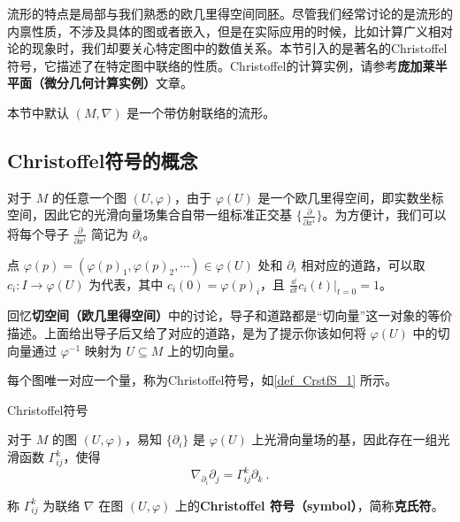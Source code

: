 


流形的特点是局部与我们熟悉的欧几里得空间同胚。尽管我们经常讨论的是流形的内禀性质，不涉及具体的图或者嵌入，但是在实际应用的时候，比如计算广义相对论的现象时，我们却要关心特定图中的数值关系。本节引入的是著名的Christoffel符号，它描述了在特定图中联络的性质。Christoffel的计算实例，请参考\textbf{庞加莱半平面（微分几何计算实例）}文章。

本节中默认 $(M, \nabla)$ 是一个带仿射联络的流形。


\subsection{Christoffel符号的概念}\label{sub_CrstfS_1}

对于 $M$ 的任意一个图 $(U, \varphi)$，由于 $\varphi(U)$ 是一个欧几里得空间，即实数坐标空间，因此它的光滑向量场集合自带一组标准正交基 $\{\frac{\partial}{\partial x^i}\}$。为方便计，我们可以将每个导子 $\frac{\partial}{\partial x^i}$ 简记为 $\partial_i$。

点 $\varphi(p)=(\varphi(p)_1, \varphi(p)_2, \cdots)\in\varphi(U)$ 处和 $\partial_i$ 相对应的道路，可以取 $c_i:I\to \varphi(U)$ 为代表，其中 $c_i(0)=\varphi(p)_i$，且 $\frac{\dd}{\dd t}c_i(t)|_{t=0}=1$。

回忆\textbf{切空间（欧几里得空间）}中的讨论，导子和道路都是“切向量”这一对象的等价描述。上面给出导子后又给了对应的道路，是为了提示你该如何将 $\varphi(U)$ 中的切向量通过 $\varphi^{-1}$ 映射为 $U\subseteq M$ 上的切向量。

每个图唯一对应一个量，称为Christoffel符号，如\autoref{def_CrstfS_1} 所示。

\begin{definition}{Christoffel符号}\label{def_CrstfS_1}

对于 $M$ 的图 $(U, \varphi)$，易知 $\{\partial_i\}$ 是 $\varphi(U)$ 上光滑向量场的基，因此存在一组光滑函数 $\Gamma^k_{ij}$，使得
\begin{equation}
\nabla_{\partial_i}\partial_j=\Gamma^k_{ij}\partial_k~.
\end{equation}

称 $\Gamma^k_{ij}$ 为联络 $\nabla$ 在图 $(U, \varphi)$ 上的\textbf{Christoffel 符号（symbol）}，简称\textbf{克氏符}。
\end{definition}

